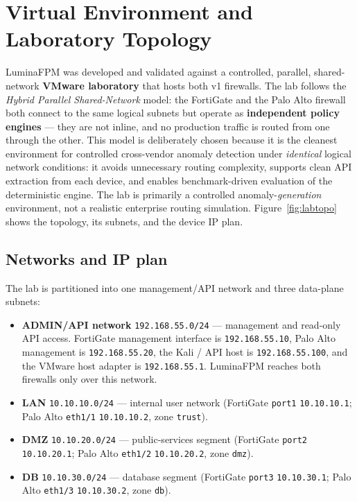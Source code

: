\section{Virtual Environment and Laboratory Topology}
\label{sec:ch3-lab}

LuminaFPM was developed and validated against a controlled, parallel, shared-network \textbf{VMware laboratory} that hosts both v1 firewalls. The lab follows the \emph{Hybrid Parallel Shared-Network} model: the FortiGate and the Palo Alto firewall both connect to the same logical subnets but operate as \textbf{independent policy engines} — they are not inline, and no production traffic is routed from one through the other. This model is deliberately chosen because it is the cleanest environment for controlled cross-vendor anomaly detection under \emph{identical} logical network conditions: it avoids unnecessary routing complexity, supports clean API extraction from each device, and enables benchmark-driven evaluation of the deterministic engine. The lab is primarily a controlled anomaly-\emph{generation} environment, not a realistic enterprise routing simulation. Figure~\ref{fig:labtopo} shows the topology, its subnets, and the device IP plan.


\subsection*{Networks and IP plan}
The lab is partitioned into one management/API network and three data-plane subnets:

\begin{itemize}[leftmargin=1.6em]
  \item \textbf{ADMIN/API network} \texttt{192.168.55.0/24} — management and read-only API access. FortiGate management interface is \texttt{192.168.55.10}, Palo Alto management is \texttt{192.168.55.20}, the Kali / API host is \texttt{192.168.55.100}, and the VMware host adapter is \texttt{192.168.55.1}. LuminaFPM reaches both firewalls only over this network.
  \item \textbf{LAN} \texttt{10.10.10.0/24} — internal user network (FortiGate \texttt{port1} \texttt{10.10.10.1}; Palo Alto \texttt{eth1/1} \texttt{10.10.10.2}, zone \texttt{trust}).
  \item \textbf{DMZ} \texttt{10.10.20.0/24} — public-services segment (FortiGate \texttt{port2} \texttt{10.10.20.1}; Palo Alto \texttt{eth1/2} \texttt{10.10.20.2}, zone \texttt{dmz}).
  \item \textbf{DB} \texttt{10.10.30.0/24} — database segment (FortiGate \texttt{port3} \texttt{10.10.30.1}; Palo Alto \texttt{eth1/3} \texttt{10.10.30.2}, zone \texttt{db}).
\end{itemize}

